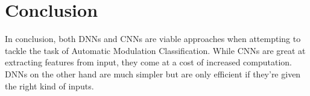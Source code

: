 \documentclass[journal,onecolumn]{IEEEtran}
\begin{document}
\section{Conclusion}

In conclusion, both DNNs and CNNs are viable approaches when attempting to tackle the task of Automatic Modulation Classification. While CNNs are great at extracting features from input, they come at a cost of increased computation. DNNs on the other hand are much simpler but are only efficient if they're given the right kind of inputs.


\ifCLASSOPTIONcaptionsoff
  \newpage
\fi





%
%
%



% 





\end{document}
